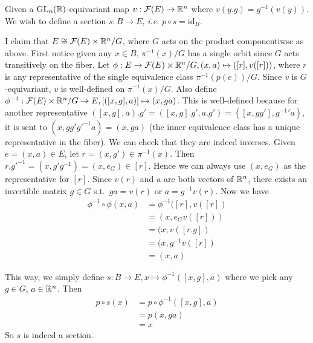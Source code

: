 \documentclass[12pt]{article}
\begin{document}
\begin{problem}[8]
\begin{enumerate}[label=(\arabic*)]
	Given a $ \text{GL}_{ n}(\mathbb{R}) $-equivariant map $ v: \mathcal{ F}(E) \to \mathbb{R}^{n}$ where $ v(y.g) = g^{-1}(v(y))$. We wish to define a section $ s: B \to E$, \emph{i.e.} $ p \circ s = \text{id}_{ B}$. 

	I claim that $ E \cong \mathcal{ F}(E) \times \mathbb{R}^{n} /G$, where $ G$ acts on the product componentiwse as above. First notice given any $ x \in B$, $ \pi ^{-1}(x) / G$ has a single orbit since $ G$ acts  transitively on the fiber. Let $ \phi: E \to  \mathcal{ F}(E) \times \mathbb{R}^{n} / G, (x,a) \mapsto ([r],v([r]))$, where $ r$ is any representative of the single equivalence class $ \pi ^{-1}(p(e)) / G$. Since $ v$ is  $ G$-equivariant,  $ v$ is well-defined on $ \pi ^{-1}(x) /G$. Also define $ \phi ^{-1}: \mathcal{ F}(E) \times \mathbb{R}^{n} / G \to E, [([x,g],a)] \mapsto (x,ga)$. This is well-defined because for another representative $([x,g],a).g' = ([x,g].g',a.g') = ([x,gg'],g^{-1}'a)$, it is sent to $(x,gg' g'^{-1}a  ) = (x,ga)$ (the inner equivalence class has a unique representative in the fiber). We can check that they are indeed inverses. Given $ e=(x,a) \in E$, let $ r=(x,g') \in \pi ^{-1}(x)$. Then $ r.g'^{-1} = (x,g'g^{-1})=(x,e_G) \in [r]$. Hence we can always use $ (x,e_G)$ as the representative for  $ [r]$. Since $ v(r)$ and  $ a$ are both vectors of  $ \mathbb{R}^{n}$, there exists an invertible matrix $ g \in G$ s.t.\ $ ga = v(r)$ or $ a=g^{-1}v(r)$. Now we have
	\begin{align*}
		\phi ^{-1} \circ \phi(x,a) &= \phi ^{-1} ([r],v([r])\\
					 &= (x,e_G v([r])) \\
					 &= (x,v([r.g]) \\
					 &= (x,g^{-1}v([r]) \\
					 &= (x,a)
	\end{align*}

	This way, we simply define  $ s: B \to E, x \mapsto \phi ^{-1} ([x,g],a)$ where we pick any $ g \in G$, $ a \in \mathbb{R}^{n}$. Then
	\begin{align*}
		p \circ s(x) &= p \circ \phi ^{-1}([x,g],a) \\
		&= p(x,ga) \\
		&= x 
	\end{align*}
So $ s$ is indeed a section.
\end{enumerate}
\end{problem}
\end{document}
